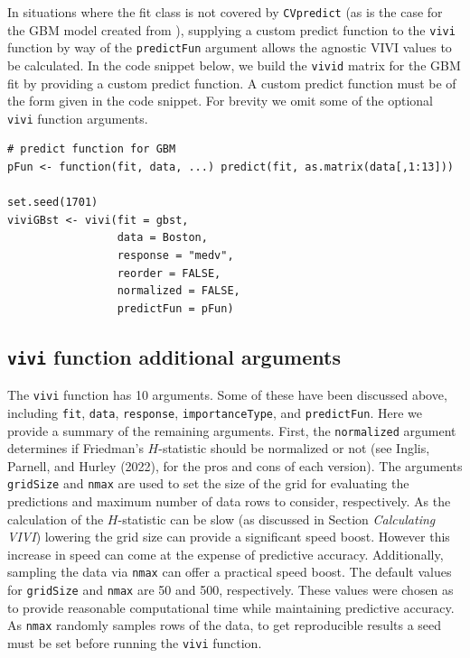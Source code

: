 In situations where the fit class is not covered by \texttt{CVpredict} (as is the case for the GBM model created from ), supplying a custom predict function to the \texttt{vivi} function by way of the \texttt{predictFun} argument allows the agnostic VIVI values to be calculated.
In the code snippet below, we build the \texttt{vivid} matrix for the GBM fit by providing a custom predict function. A custom predict function must be of the form given in the code snippet.
For brevity we omit some of the optional \texttt{vivi} function arguments.

\begin{verbatim}
# predict function for GBM
pFun <- function(fit, data, ...) predict(fit, as.matrix(data[,1:13]))

set.seed(1701) 
viviGBst <- vivi(fit = gbst,
                 data = Boston,
                 response = "medv",
                 reorder = FALSE,
                 normalized = FALSE,
                 predictFun = pFun)
\end{verbatim}

\hypertarget{sec:vivimatarg}{%
\subsection{\texorpdfstring{\texttt{vivi} function additional arguments}{vivi function additional arguments}}\label{sec:vivimatarg}}

The \texttt{vivi} function has 10 arguments. Some of these have been discussed above, including \texttt{fit}, \texttt{data}, \texttt{response}, \texttt{importanceType}, and \texttt{predictFun}. Here we provide a summary of the remaining arguments. First, the \texttt{normalized} argument determines if Friedman's \(H\)-statistic should be normalized or not (see Inglis, Parnell, and Hurley (2022), for the pros and cons of each version). The arguments \texttt{gridSize} and \texttt{nmax} are used to set the size of the grid for evaluating the predictions and maximum number of data rows to consider, respectively. As the calculation of the \(H\)-statistic can be slow (as discussed in Section \emph{Calculating VIVI}) lowering the grid size can provide a significant speed boost. However this increase in speed can come at the expense of predictive accuracy. Additionally, sampling the data via \texttt{nmax} can offer a practical speed boost. The default values for \texttt{gridSize} and \texttt{nmax} are 50 and 500, respectively. These values were chosen as to provide reasonable computational time while maintaining predictive accuracy. As \texttt{nmax} randomly samples rows of the data, to get reproducible results a seed must be set before running the \texttt{vivi} function.

